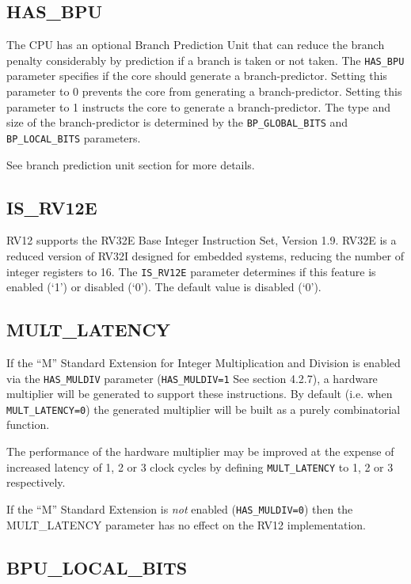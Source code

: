 \subsection{HAS\_BPU}\label{has_bpu}

The CPU has an optional Branch Prediction Unit that can reduce the
branch penalty considerably by prediction if a branch is taken or not
taken. The \texttt{HAS\_BPU} parameter specifies if the core should generate a
branch-predictor. Setting this parameter to 0 prevents the core from
generating a branch-predictor. Setting this parameter to 1 instructs the
core to generate a branch-predictor. The type and size of the
branch-predictor is determined by the \texttt{BP\_GLOBAL\_BITS} and
\texttt{BP\_LOCAL\_BITS} parameters.

See branch prediction unit section for more details.

\subsection{IS\_RV12E}\label{is_rv12e}

RV12 supports the RV32E Base Integer Instruction Set, Version 1.9. RV32E
is a reduced version of RV32I designed for embedded systems, reducing
the number of integer registers to 16. The \texttt{IS\_RV12E} parameter
determines if this feature is enabled (`1') or disabled (`0'). The
default value is disabled (`0').

\subsection{MULT\_LATENCY}\label{mult_latency}

If the ``M'' Standard Extension for Integer Multiplication and Division
is enabled via the \texttt{HAS\_MULDIV} parameter (\texttt{HAS\_MULDIV=1} See section
4.2.7), a hardware multiplier will be generated to support these
instructions. By default (i.e. when \texttt{MULT\_LATENCY=0}) the generated multiplier will
be built as a purely combinatorial function.

The performance of the hardware multiplier may be improved at the
expense of increased latency of 1, 2 or 3 clock cycles by defining
\texttt{MULT\_LATENCY} to 1, 2 or 3 respectively.

If the ``M'' Standard Extension is \emph{not} enabled (\texttt{HAS\_MULDIV=0})
then the MULT\_LATENCY parameter has no effect on the RV12
implementation.

\subsection{BPU\_LOCAL\_BITS}\label{bpu_local_bits}

